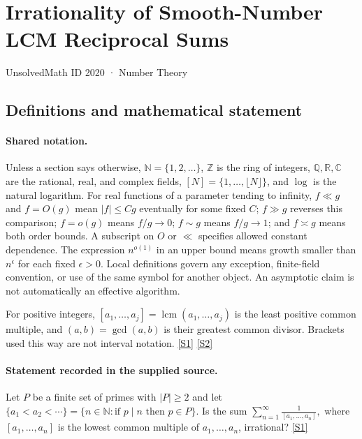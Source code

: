 \documentclass[11pt,a4paper]{article}
\newcommand{\N}{\mathbb{N}}
\newcommand{\Z}{\mathbb{Z}}
\newcommand{\Q}{\mathbb{Q}}
\newcommand{\R}{\mathbb{R}}
\newcommand{\C}{\mathbb{C}}
\newcommand{\sref}[2]{\hyperlink{source:#1:#2}{[S#2]}}
\begin{document}

\setcounter{section}{2019}

\section{Irrationality of Smooth-Number LCM Reciprocal Sums}\label{2020}

{\small\sffamily UnsolvedMath ID 2020 · Number Theory}

\subsection{Definitions and mathematical statement}

\paragraph{Shared notation.}Unless a section says otherwise, $\N=\{1,2,\ldots\}$,
$\Z$ is the ring of integers, $\Q,\R,\C$ are the rational, real, and complex
fields, $[N]=\{1,\ldots,\lfloor N\rfloor\}$, and $\log$ is the natural
logarithm. For real functions of a parameter tending to infinity,
$f\ll g$ and $f=O(g)$ mean $|f|\leq Cg$ eventually for some fixed $C$;
$f\gg g$ reverses this comparison; $f=o(g)$ means $f/g\to0$;
$f\sim g$ means $f/g\to1$; and $f\asymp g$ means both order bounds.
A subscript on $O$ or $\ll$ specifies allowed constant dependence.
The expression $n^{o(1)}$ in an upper bound means growth smaller than
$n^\epsilon$ for each fixed $\epsilon>0$. Local definitions govern any
exception, finite-field convention, or use of the same symbol for another
object. An asymptotic claim is not automatically an effective algorithm.



For positive integers, $[a_1,\ldots,a_j]=\operatorname{lcm}(a_1,\ldots,a_j)$ is the least positive common multiple, and $(a,b)=\gcd(a,b)$ is their greatest common divisor. Brackets used this way are not interval notation. \sref{2020}{1} \sref{2020}{2}

\paragraph{Statement recorded in the supplied source.}
Let $P$ be a finite set of primes with $\lvert P\rvert \geq 2$ and let $\{a_1<a_2<\cdots\}=\{ n\in \mathbb{N} : \textrm{if }p\mid n\textrm{ then }p\in P\}$. Is the sum $ \sum_{n=1}^\infty \frac{1}{[a_1,\ldots,a_n]}, $ where $[a_1,\ldots,a_n]$ is the lowest common multiple of $a_1,\ldots,a_n$, irrational? \sref{2020}{1}
\end{document}
